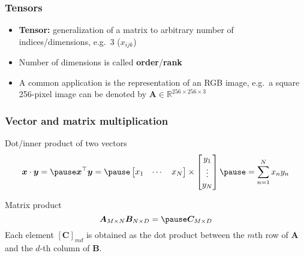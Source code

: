 \documentclass[smaller]{beamer}
\newcommand{\?}{\stackrel{?}{=}}
\newcommand{\mb}{\mathbb}
\newcommand{\tr}{^{\top}}
\begin{document}
\begin{frame}
  \frametitle{Tensors}

  \begin{itemize}
  \item \textbf{Tensor:} generalization of a matrix to arbitrary
    number of indices/dimensions, e.g.\ 3 ($x_{ijk}$)

    \pause

  \item Number of dimensions is called \textbf{order}/\textbf{rank}
    \pause

  \item A common application is the representation of an RGB image,
    e.g.\ a square 256-pixel image can be denoted by $\bm A\in \mb
    R^{256\times 256\times 3}$

  \end{itemize}
\end{frame}





\begin{frame}
  \frametitle{Vector and matrix multiplication}
  \pause

  \begin{block}{Dot/inner product of two vectors}
    \pause
    \begin{equation}
      \bm x\cdot\bm y = \pause \bm x\tr \bm y = \pause
      \begin{bmatrix}
        x_{1} & \cdots & x_{N} 
      \end{bmatrix}
      \times
      \begin{bmatrix}
        y_{1} \\ \vdots \\ y_{N}
      \end{bmatrix}
      \pause = \sum_{n=1}^{N} x_{n}y_{n}
    \end{equation}
  \end{block}
  \pause
  \begin{block}{Matrix product}
    \pause
    \begin{equation}
      \bm A_{M\times N} \bm B_{N\times D} = \pause \bm C_{M\times D}
    \end{equation}
    \pause
    Each element $[\bm C]_{md}$ is obtained as the dot product between the $m$th row of $\bm A$ and the $d$-th column of $\bm B$.
  \end{block}
\end{frame}
\end{document}
